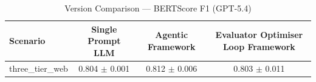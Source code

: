 \begin{table}[htbp]
\centering
\caption{Version Comparison — BERTScore F1 (GPT-5.4)}
\label{tab:version_bert_score_f1}
\begin{tabular}{lccc}
\toprule
Scenario & Single Prompt LLM & Agentic Framework & Evaluator Optimiser Loop Framework \\
\midrule
three\_tier\_web & 0.804 $\pm$ 0.001 & 0.812 $\pm$ 0.006 & 0.803 $\pm$ 0.011 \\
\bottomrule
\end{tabular}
\end{table}